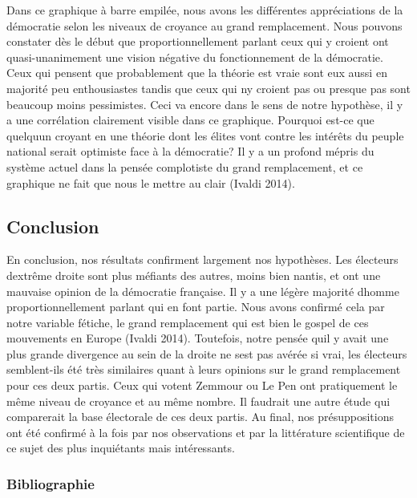 \documentclass[
  letterpaper,
  DIV=11,
  numbers=noendperiod]{scrartcl}
\begin{document}
Dans ce graphique à barre empilée, nous avons les différentes
appréciations de la démocratie selon les niveaux de croyance au grand
remplacement. Nous pouvons constater dès le début que
proportionnellement parlant ceux qui y croient ont quasi-unanimement une
vision négative du fonctionnement de la démocratie. Ceux qui pensent que
probablement que la théorie est vraie sont eux aussi en majorité peu
enthousiastes tandis que ceux qui n\textquotesingle y croient pas ou
presque pas sont beaucoup moins pessimistes. Ceci va encore dans le sens
de notre hypothèse, il y a une corrélation clairement visible dans ce
graphique. Pourquoi est-ce que quelqu\textquotesingle un croyant en une
théorie dont les élites vont contre les intérêts du peuple national
serait optimiste face à la démocratie? Il y a un profond mépris du
système actuel dans la pensée complotiste du grand remplacement, et ce
graphique ne fait que nous le mettre au clair (Ivaldi 2014).

\hypertarget{conclusion}{%
\subsection{Conclusion}\label{conclusion}}

En conclusion, nos résultats confirment largement nos hypothèses. Les
électeurs d\textquotesingle extrême droite sont plus méfiants des
autres, moins bien nantis, et ont une mauvaise opinion de la démocratie
française. Il y a une légère majorité d\textquotesingle homme
proportionnellement parlant qui en font partie. Nous avons confirmé cela
par notre variable fétiche, le grand remplacement qui est bien le gospel
de ces mouvements en Europe (Ivaldi 2014). Toutefois, notre pensée
qu\textquotesingle il y avait une plus grande divergence au sein de la
droite ne s\textquotesingle est pas avérée si vrai, les électeurs
semblent-ils été très similaires quant à leurs opinions sur le grand
remplacement pour ces deux partis. Ceux qui votent Zemmour ou Le Pen ont
pratiquement le même niveau de croyance et au même nombre. Il faudrait
une autre étude qui comparerait la base électorale de ces deux partis.
Au final, nos présuppositions ont été confirmé à la fois par nos
observations et par la littérature scientifique de ce sujet des plus
inquiétants mais intéressants.

\hypertarget{bibliographie}{%
\subsubsection{Bibliographie}\label{bibliographie}}
\end{document}
